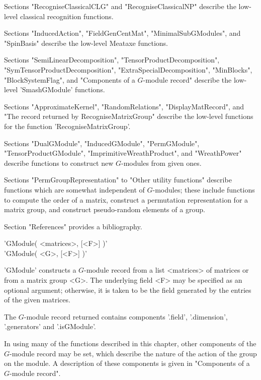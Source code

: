 Sections  "RecogniseClassicalCLG" and "RecogniseClassicalNP" describe the
low-level classical recognition functions.

Sections   "InducedAction", "FieldGenCentMat", "MinimalSubGModules",  and
"SpinBasis" describe the low-level Meataxe functions.

Sections     "SemiLinearDecomposition",     "TensorProductDecomposition",
"SymTensorProductDecomposition",             "ExtraSpecialDecomposition",
"MinBlocks", "BlockSystemFlag", and  "Components of a  $G$-module record"
describe the low-level 'SmashGModule' functions.

Sections "ApproximateKernel", "RandomRelations",  "DisplayMatRecord", and
"The  record  returned by   RecogniseMatrixGroup" describe  the low-level
functions for the function 'Re\-co\-gnise\-Matrix\-Group'.

Sections       "DualGModule",      "InducedGModule",       "PermGModule",
"TensorProductGModule", "ImprimitiveWreathProduct",     and "WreathPower"
describe functions to construct new $G$-modules from given ones.

Sections "PermGroupRepresentation" to  "Other utility functions" describe
functions which  are somewhat independent   of $G$-modules; these include
functions  to compute  the order   of a  matrix, construct a  permutation
representation for a matrix  group, and construct  pseudo-random elements
of a group.

Section "References" provides a bibliography.


'GModule( <matrices>, [<F>] )' \\
'GModule( <G>, [<F>] )' 

'GModule'  constructs a  $G$-module  record   from a list  <matrices>  of
matrices or  from a  matrix group  <G>. The underlying  field <F>  may be
specified as an optional argument; otherwise, it is taken to be the field
generated by the entries of the given matrices.

The   $G$-module    record   returned     contains  components  '.field',
'.dimension', '.generators' and '.isGModule'.

In using   many  of  the  functions described  in    this  chapter, other
components of the $G$-module record may be set, which describe the nature
of  the action  of   the group on  the  module.   A description of  these
components is given in "Components of a $G$-module record".

